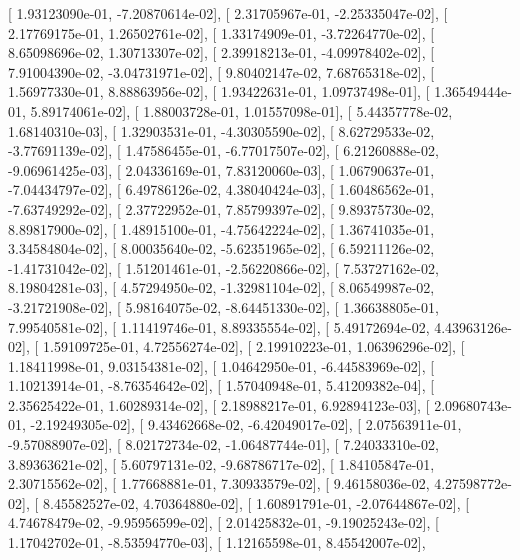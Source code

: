 \documentclass{article}
\begin{document}
       [  1.93123090e-01,  -7.20870614e-02],
       [  2.31705967e-01,  -2.25335047e-02],
       [  2.17769175e-01,   1.26502761e-02],
       [  1.33174909e-01,  -3.72264770e-02],
       [  8.65098696e-02,   1.30713307e-02],
       [  2.39918213e-01,  -4.09978402e-02],
       [  7.91004390e-02,  -3.04731971e-02],
       [  9.80402147e-02,   7.68765318e-02],
       [  1.56977330e-01,   8.88863956e-02],
       [  1.93422631e-01,   1.09737498e-01],
       [  1.36549444e-01,   5.89174061e-02],
       [  1.88003728e-01,   1.01557098e-01],
       [  5.44357778e-02,   1.68140310e-03],
       [  1.32903531e-01,  -4.30305590e-02],
       [  8.62729533e-02,  -3.77691139e-02],
       [  1.47586455e-01,  -6.77017507e-02],
       [  6.21260888e-02,  -9.06961425e-03],
       [  2.04336169e-01,   7.83120060e-03],
       [  1.06790637e-01,  -7.04434797e-02],
       [  6.49786126e-02,   4.38040424e-03],
       [  1.60486562e-01,  -7.63749292e-02],
       [  2.37722952e-01,   7.85799397e-02],
       [  9.89375730e-02,   8.89817900e-02],
       [  1.48915100e-01,  -4.75642224e-02],
       [  1.36741035e-01,   3.34584804e-02],
       [  8.00035640e-02,  -5.62351965e-02],
       [  6.59211126e-02,  -1.41731042e-02],
       [  1.51201461e-01,  -2.56220866e-02],
       [  7.53727162e-02,   8.19804281e-03],
       [  4.57294950e-02,  -1.32981104e-02],
       [  8.06549987e-02,  -3.21721908e-02],
       [  5.98164075e-02,  -8.64451330e-02],
       [  1.36638805e-01,   7.99540581e-02],
       [  1.11419746e-01,   8.89335554e-02],
       [  5.49172694e-02,   4.43963126e-02],
       [  1.59109725e-01,   4.72556274e-02],
       [  2.19910223e-01,   1.06396296e-02],
       [  1.18411998e-01,   9.03154381e-02],
       [  1.04642950e-01,  -6.44583969e-02],
       [  1.10213914e-01,  -8.76354642e-02],
       [  1.57040948e-01,   5.41209382e-04],
       [  2.35625422e-01,   1.60289314e-02],
       [  2.18988217e-01,   6.92894123e-03],
       [  2.09680743e-01,  -2.19249305e-02],
       [  9.43462668e-02,  -6.42049017e-02],
       [  2.07563911e-01,  -9.57088907e-02],
       [  8.02172734e-02,  -1.06487744e-01],
       [  7.24033310e-02,   3.89363621e-02],
       [  5.60797131e-02,  -9.68786717e-02],
       [  1.84105847e-01,   2.30715562e-02],
       [  1.77668881e-01,   7.30933579e-02],
       [  9.46158036e-02,   4.27598772e-02],
       [  8.45582527e-02,   4.70364880e-02],
       [  1.60891791e-01,  -2.07644867e-02],
       [  4.74678479e-02,  -9.95956599e-02],
       [  2.01425832e-01,  -9.19025243e-02],
       [  1.17042702e-01,  -8.53594770e-03],
       [  1.12165598e-01,   8.45542007e-02],
\end{document}

